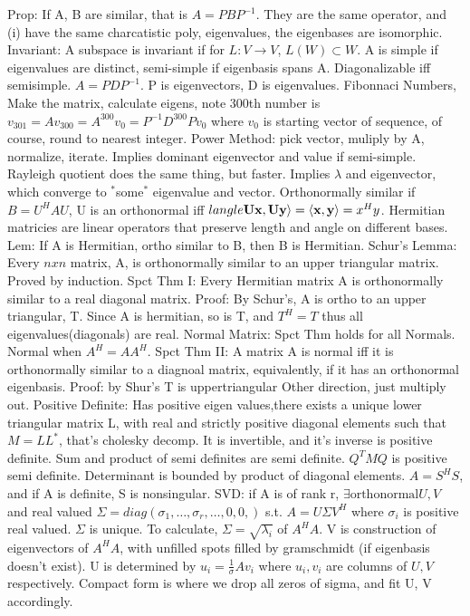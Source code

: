 \documentclass[8pt]{extarticle}
\theoremstyle{definition}
\begin{document}
{Prop: If A, B are similar, that is $A = PBP^{-1}$. They are the same operator, and 
(i) have the same charcatistic poly, eigenvalues, the eigenbases are isomorphic.
Invariant: A subspace is invariant if for $L:V \rightarrow V$, $L(W) \subset W$. 
A is simple if eigenvalues are distinct, semi-simple if eigenbasis spans A. Diagonalizable iff semisimple. $A=PDP^{-1}$. P is eigenvectors, D is eigenvalues. 
Fibonnaci Numbers, Make the matrix, calculate eigens, note 300th number is
$v_{301} = Av_{300} = A^{300}v_0 = P^{-1}D^{300}Pv_0$ where $v_0$ is starting vector of sequence, of course, round to nearest integer.
Power Method: pick vector, muliply by A, normalize, iterate. Implies dominant eigenvector and value if semi-simple.
Rayleigh quotient does the same thing, but faster. Implies $\lambda$ and eigenvector, which converge to $^*$some$^*$ eigenvalue and vector.
Orthonormally similar if $B=U^HAU$, U is an orthonormal iff $\\langle \mathbf{Ux}, \mathbf{Uy} \rangle = \langle \mathbf{x}, \mathbf{y} \rangle = x^Hy$.
Hermitian matricies are linear operators that preserve length and angle on different bases.
Lem: If A is Hermitian, ortho similar to B, then B is Hermitian.
Schur's Lemma: Every $nxn$ matrix, A, is orthonormally similar to an upper triangular matrix. Proved by induction.
Spct Thm I: Every Hermitian matrix A is orthonormally similar to a real diagonal matrix. 
Proof: By Schur's, A is ortho to an upper triangular, T. Since A is hermitian, so is T, and $T^H = T$ thus all eigenvalues(diagonals) are real.
Normal Matrix: Spct Thm holds for all Normals. Normal when $A^H = AA^H$.
Spct Thm II: A matrix A is normal iff it is orthonormally similar to a diagnoal matrix, equivalently, if it has an orthonormal eigenbasis. Proof: by Shur's T is uppertriangular
Other direction, just multiply out. 
Positive Definite: Has positive eigen values,there exists a unique lower triangular matrix L, with real and strictly positive diagonal elements such that $M = LL^*$, that's cholesky decomp.
It is invertible, and it's inverse is positive definite. Sum and product of semi definites are semi definite. $Q^TMQ$ is positive semi definite.
Determinant is bounded by product of diagonal elements.
$A = S^HS$, and if A is definite, S is nonsingular.
SVD: if A is of rank r, $\exists \text{orthonormal} U, V$ and real valued $\Sigma = diag(\sigma_1,\dots,\sigma_r, \dots,0,0,)$ s.t. $A = U\Sigma V^H$ where $\sigma_i$ is positive real valued. $\Sigma$ is unique. To calculate, $\Sigma = \sqrt{\lambda_i} $ of $A^HA$. V is construction of eigenvectors of $A^HA$, with unfilled spots filled by gramschmidt (if eigenbasis doesn't exist). U is determined by $u_i = \frac{1}{\sigma}Av_i$ where $u_i, v_i$ are columns of $U,V$ respectively. Compact form is where we drop all zeros of sigma, and fit U, V accordingly.
}
\end{document}
